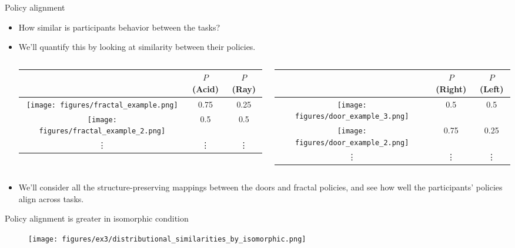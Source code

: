 \documentclass{beamer}
\begin{document}
\begin{frame}{Policy alignment}
\begin{itemize}
\item How similar is participants behavior between the tasks? 
\item<2-> We'll quantify this by looking at similarity between their policies.
\begin{columns}
\begin{column}{0.5\textwidth}
\begin{center}
\begin{tabular}{|c|c|c|}
\hline 
& \(P\)(Acid) & \(P\)(Ray) \\
\hline
\texttt{[image: figures/fractal\_example.png]} & 0.75 & 0.25\\ \hline
\texttt{[image: figures/fractal\_example\_2.png]} & 0.5 & 0.5 \\ \hline
 \vdots & \vdots & \vdots \\ \hline
\end{tabular}
\end{center}
\end{column}
\begin{column}{0.5\textwidth}
\begin{center}
\begin{tabular}{|c|c|c|}
\hline 
& \(P\)(Right) & \(P\)(Left) \\
\hline
\texttt{[image: figures/door\_example\_3.png]} & 0.5 & 0.5\\ \hline
\texttt{[image: figures/door\_example\_2.png]} & 0.75 & 0.25 \\ \hline
 \vdots & \vdots & \vdots \\ \hline
\end{tabular}
\end{center}
\end{column}
\end{columns}
\item<3-> We'll consider all the structure-preserving mappings between the doors and fractal policies, and see how well the participants' policies align across tasks.
\end{itemize}
\end{frame}

\begin{frame}{Policy alignment is greater in isomorphic condition}
\begin{figure}
\centering
\texttt{[image: figures/ex3/distributional\_similarities\_by\_isomorphic.png]}
\end{figure}
\end{frame}
\end{document}
